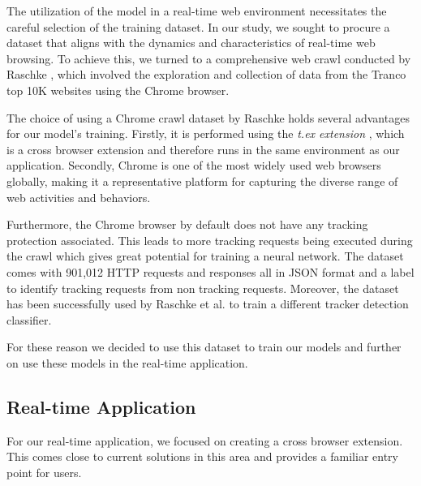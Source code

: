 The utilization of the model in a real-time web environment necessitates the careful selection of the training dataset.
In our study, we sought to procure a dataset that aligns with the dynamics and characteristics of real-time web browsing.
To achieve this, we turned to a comprehensive web crawl conducted by Raschke \cite{raschke_philip_2022_7123945}, which involved the exploration and collection
of data from the Tranco top 10K websites using the Chrome browser.

The choice of using a Chrome crawl dataset by Raschke holds several advantages for our model's training. Firstly, it is performed 
using the \emph{t.ex extension} \cite{9972261}, which is a cross browser extension and therefore runs in the same environment as our
application. Secondly, Chrome is one of the most widely used web browsers globally, making it a representative platform for
capturing the diverse range of web activities and behaviors.

Furthermore, the Chrome browser by default does not have any tracking protection associated. This leads to more tracking requests being executed
during the crawl which gives great potential for training a neural network. The dataset comes with 901,012 HTTP requests and responses all in JSON
format and a label to identify tracking requests from non tracking requests. Moreover, the dataset has been successfully used by Raschke et al. \cite{raschke2023}
to train a different tracker detection classifier.

For these reason we decided to use this dataset \cite{raschke_philip_2022_7123945} to train our models and further on use these models
in the real-time application.

\subsection{Real-time Application}

For our real-time application, we focused on creating a cross browser extension. This comes close to current solutions in this area 
and provides a familiar entry point for users. 

